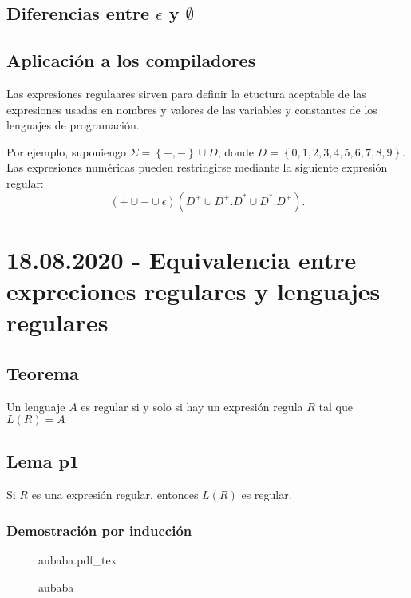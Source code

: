 \documentclass[a4paper,dvipsnames]{book}
\newcommand{\incfig}[2][1]{%
    \def\svgwidth{#1\columnwidth}
    {#2.pdf_tex}
}
\begin{document}
\subsection{Diferencias entre \(\epsilon\) y \(\emptyset\)}
\label{ssec:diferencias_entre_mk}



\subsection{Aplicación a los compiladores}
\label{ssec:aplicacion_a_los_compiladores}

Las expresiones regulaares sirven para definir la etuctura aceptable  de las
expresiones usadas en nombres y valores de las variables y constantes de los
lenguajes de programación.

{\color{BrickRed} Por ejemplo}, suponiengo \(\Sigma =\left\{+,-\right\} \cup
D\), donde \(D=\left\{0,1,2,3,4,5,6,7,8,9\right\}\). Las expresiones numéricas
pueden restringirse mediante la siguiente expresión regular:
\[\left(+\cup -\cup \epsilon \right)\left(D^{+}\cup D^{+}.D^{*}\cup D^{*}.D^{+}\right).\]

\section{18.08.2020 - Equivalencia entre expreciones regulares y lenguajes regulares}
\label{sec:equivalencia_entre_expreciones_regulares_y_lenguajes_regulares}

\subsection{Teorema}
\label{ssec:teorema}

Un lenguaje \(A\) es regular si y solo si hay un expresión regula \(R\) tal que
\(L\left(R\right)=A\)

\subsection{Lema p1}
Si \(R\) es una expresión regular, entonces \(L\left(R\right)\) es regular.
\subsubsection{Demostración por inducción}

\begin{figure}[ht]
    \centering
    \incfig{aubaba}
    \caption{aubaba}
    \label{fig:aubaba}
\end{figure}
\end{document}
